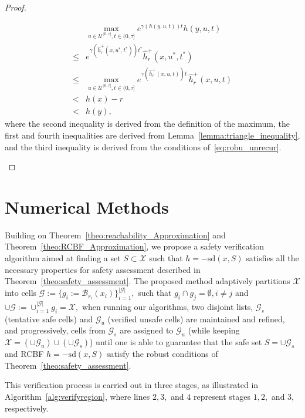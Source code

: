 \documentclass[letterpaper, 10 pt, conference]{ieeeconf}
\newcommand{\X}{\mathcal{X}}
\begin{document}
{\begin{proof}
\begin{itemize}
\begin{align*}
  & \max_{u \in \mathcal{U}^{(0,\tau]}, t \in (0, \tau]} e^{\gamma(h(y, u, t)) t} h(y, u, t)\\
  \le &
e^{\gamma(\hat h_r^+(x, u^*, t^*)) t^*} \hat h_r^+(x, u^*, t^*)
  \\
  \leq & \max\limits_{u \in \mathcal{U}^{(0,\tau]}, t \in (0,\tau]} e^{\gamma(\hat h_r^+(x,u,t)) t}\, \hat{h}_{r}^{+}(x, u, t)\\
  < & h(x)-r\\
  < & h(y),
\end{align*}
where the second inequality is derived from the definition of the maximum, the first and fourth inequalities are derived from Lemma~\ref{lemma:triangle_inequality}, and the third inequality is derived from the conditions of~\eqref{eq:robu_unrecur}.
\end{itemize}
\end{proof}}

\section{Numerical Methods}
\label{sec:algorithms}

Building on Theorem~\ref{theo:reachability_Approximation} and Theorem~\ref{theo:RCBF_Approximation}, we propose a safety verification algorithm aimed at finding a set $S\subset \X$ such that $h=-\mathrm{sd}(x,S)$ satisfies all the necessary properties for safety assessment described in Theorem~\ref{theo:safety_assessment}.
The proposed method adaptively partitions $\mathcal{X}$ into cells
$
\mathcal{G}:=\{g_i:=\mathcal{B}_{r_i}(x_i)\}_{i=1}^{|\mathcal{G}|},$  such that $g_i\cap g_j=\emptyset, i \neq j$ and $\cup\mathcal{G}:=\cup_{i=1}^{|\mathcal{G}|} g_i=\mathcal{X},$ 
when running our algorithms, two disjoint lists, $\mathcal{G}_s$ (tentative safe cells) and $\mathcal{G}_u$ (verified unsafe cells) are maintained and refined, and progressively, cells from $\mathcal{G}_s$ are assigned to $\mathcal{G}_u$ (while keeping $\X = (\cup \mathcal{G}_u) \cup (\cup\mathcal{G}_s)$) until one is able to guarantee that the safe set $S=\cup \mathcal{G}_s$ and RCBF $h=-\mathrm{sd}(x,S)$ satisfy the robust conditions of Theorem~\ref{theo:safety_assessment}.

This verification process is carried out in three stages, as illustrated in Algorithm~\ref{alg:verifyregion}, where lines $2, 3,$ and $4$ represent stages $1, 2,$ and $3$, respectively.
\end{document}
